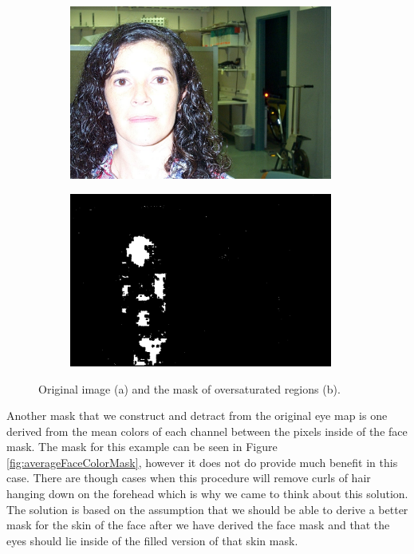 \begin{figure}[H]
\centering

\begin{subfigure}{.33\textwidth}
  \centering
  \includegraphics[width=0.95\textwidth]{img/fd2/overSaturated_input.jpg}
  \caption{}
\end{subfigure}%
\begin{subfigure}{.33\textwidth}
  \centering
  \includegraphics[width=0.95\textwidth]{img/fd2/overSaturated.png}
  \caption{}
\end{subfigure}%

\caption{Original image (a) and the mask of oversaturated regions (b).}
\label{fig:overSaturated}
\end{figure}

Another mask that we construct and detract from the original eye map is one derived from the mean colors of each channel between the pixels inside of the face mask. The mask for this example can be seen in Figure \ref{fig:averageFaceColorMask}, however it does not do provide much benefit in this case. There are though cases when this procedure will remove curls of hair hanging down on the forehead which is why we came to think about this solution. The solution is based on the assumption that we should be able to derive a better mask for the skin of the face after we have derived the face mask and that the eyes should lie inside of the filled version of that skin mask.

